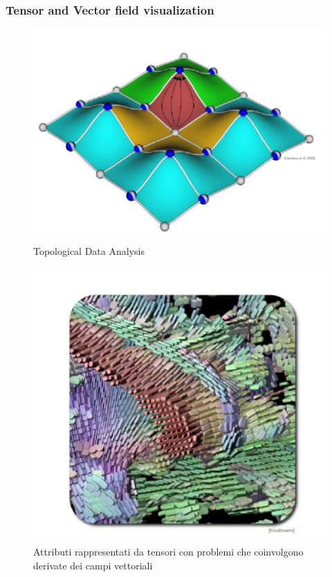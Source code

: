 \subsubsection{Tensor and Vector field visualization}
\begin{figure}[htbp]
    \centering
    \begin{minipage}{0.45\textwidth}
        \centering
        \includegraphics[width=\linewidth]{images/VecF.png} 
        \caption{Topological Data Analysis}
        \label{fig:immagine1}
    \end{minipage}\hfill
    \begin{minipage}{0.45\textwidth}
        \centering
        \includegraphics[width=\linewidth]{images/TensorField.png} %
        \caption{Attributi rappresentati da tensori con problemi che coinvolgono derivate dei campi vettoriali }
        \label{fig:immagine2}
    \end{minipage}
\end{figure}

